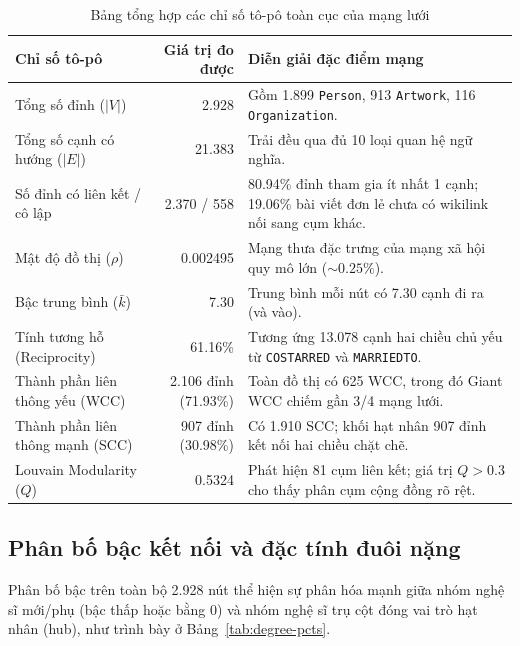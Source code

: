 \documentclass[12pt,a4paper]{article}
\renewcommand{\_}{\oldunderscore\hspace{0pt}}
\begin{document}
\begin{table}[htbp]
\centering
\small
\begin{tabularx}{\textwidth}{P{4.9cm} r L}
\toprule
Chỉ số tô-pô & Giá trị đo được & Diễn giải đặc điểm mạng \\
\midrule
Tổng số đỉnh ($|V|$) & 2.928 & Gồm 1.899 \texttt{Person}, 913 \texttt{Artwork}, 116 \texttt{Organization}. \\
Tổng số cạnh có hướng ($|E|$) & 21.383 & Trải đều qua đủ 10 loại quan hệ ngữ nghĩa. \\
Số đỉnh có liên kết / cô lập & 2.370 / 558 & 80.94\% đỉnh tham gia ít nhất 1 cạnh; 19.06\% bài viết đơn lẻ chưa có wikilink nối sang cụm khác. \\
Mật độ đồ thị ($\rho$) & 0.002495 & Mạng thưa đặc trưng của mạng xã hội quy mô lớn ($\sim 0.25\%$). \\
Bậc trung bình ($\bar{k}$) & 7.30 & Trung bình mỗi nút có 7.30 cạnh đi ra (và vào). \\
Tính tương hỗ (Reciprocity) & 61.16\% & Tương ứng 13.078 cạnh hai chiều chủ yếu từ \texttt{CO\_STARRED} và \texttt{MARRIED\_TO}. \\
Thành phần liên thông yếu (WCC) & 2.106 đỉnh (71.93\%) & Toàn đồ thị có 625 WCC, trong đó Giant WCC chiếm gần 3/4 mạng lưới. \\
Thành phần liên thông mạnh (SCC) & 907 đỉnh (30.98\%) & Có 1.910 SCC; khối hạt nhân 907 đỉnh kết nối hai chiều chặt chẽ. \\
Louvain Modularity ($Q$) & 0.5324 & Phát hiện 81 cụm liên kết; giá trị $Q > 0.3$ cho thấy phân cụm cộng đồng rõ rệt. \\
\bottomrule
\end{tabularx}
\caption{Bảng tổng hợp các chỉ số tô-pô toàn cục của mạng lưới}
\label{tab:global-stats}
\end{table}

\subsection{Phân bố bậc kết nối và đặc tính đuôi nặng}

Phân bố bậc trên toàn bộ 2.928 nút thể hiện sự phân hóa mạnh giữa nhóm nghệ sĩ mới/\allowbreak phụ (bậc thấp hoặc bằng 0) và nhóm nghệ sĩ trụ cột đóng vai trò hạt nhân (hub), như trình bày ở Bảng~\ref{tab:degree-pcts}.
\end{document}
